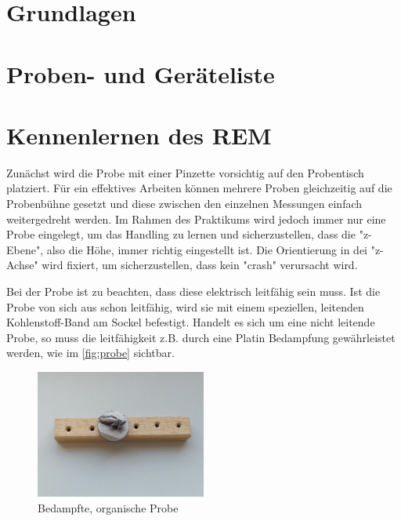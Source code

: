 \documentclass[12pt,english,ngerman]{scrartcl}
\begin{document}
\section{Grundlagen}



\section{Proben- und Geräteliste}


\section{Kennenlernen des REM}


Zunächst wird die Probe mit einer Pinzette vorsichtig auf den Probentisch platziert. Für ein effektives Arbeiten können 
mehrere Proben gleichzeitig auf die Probenbühne gesetzt und diese zwischen den einzelnen Messungen einfach weitergedreht
werden. Im Rahmen des Praktikums wird jedoch immer nur eine Probe eingelegt, um das Handling zu lernen und sicherzustellen,
dass die "z-Ebene", also die Höhe, immer richtig eingestellt ist. Die Orientierung in dei "z-Achse" wird fixiert, um 
sicherzustellen, dass kein "crash" verursacht wird.

Bei der Probe ist zu beachten, dass diese elektrisch leitfähig sein muss. Ist die Probe von sich aus schon leitfähig, wird
sie mit einem speziellen, leitenden Kohlenstoff-Band am Sockel befestigt. Handelt es sich um eine nicht leitende Probe, so 
muss die leitfähigkeit z.B. durch eine Platin Bedampfung gewährleistet werden, wie im \autoref{fig:probe} sichtbar.

\begin{figure}[H]
	\begin{center}
		\includegraphics[width =0.5\textwidth]{./figures/probe.png}
	\end{center}
	\caption[Bedampfte, organische Probe]
	{Bedampfte, organische Probe \cite{sein_foto}}
    \label{fig:probe}
\end{figure}
\end{document}
